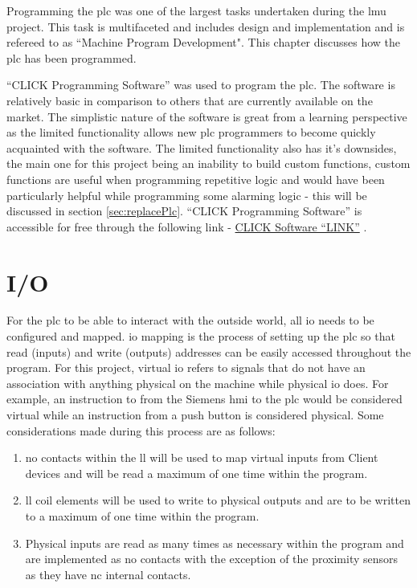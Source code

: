 Programming the \acrshort{plc} was one of the largest tasks undertaken during the \acrshort{lmu} project. This task is multifaceted and includes design and implementation and is refereed to as ``Machine Program Development". This chapter discusses how the \acrshort{plc} has been programmed.

``CLICK Programming Software'' was used to program the \acrshort{plc}. The software is relatively basic in comparison to others that are currently available on the market. The simplistic nature of the software is great from a learning perspective as the limited functionality allows new \acrshort{plc} programmers to become quickly acquainted with the software. The limited functionality also has it's downsides, the main one for this project being an inability to build custom functions, custom functions are useful when programming repetitive logic and would have been particularly helpful while programming some alarming logic - this will be discussed in section \ref{sec:replacePlc}. ``CLICK Programming Software'' is accessible for free through the following link - \href{https://www.automationdirect.com/clickplcs/free-software/free-click-software}{CLICK Software ``LINK''} \cite{clickSoftwareDownload}.


\section{I/O}
    For the \acrshort{plc} to be able to interact with the outside world, all \acrshort{io} needs to be configured and mapped. \acrshort{io} mapping is the process of setting up the \acrshort{plc} so that read (inputs) and write (outputs) addresses can be easily accessed throughout the program. For this project, virtual \acrshort{io} refers to signals that do not have an association with anything physical on the machine while physical \acrshort{io} does. For example, an instruction to from the Siemens \acrshort{hmi} to the \acrshort{plc} would be considered virtual while an instruction from a push button is considered physical. Some considerations made during this process are as follows:
    
    \begin{enumerate}
        \item \acrshort{no} contacts within the \acrshort{ll} will be used to map virtual inputs from Client devices and will be read a maximum of one time within the program.
        \item \acrshort{ll} coil elements will be used to write to physical outputs and are to be written to a maximum of one time within the program. 
        \item Physical inputs are read as many times as necessary within the program and are implemented as \acrshort{no} contacts with the exception of the proximity sensors as they have \acrshort{nc} internal contacts. 
    \end{enumerate}


